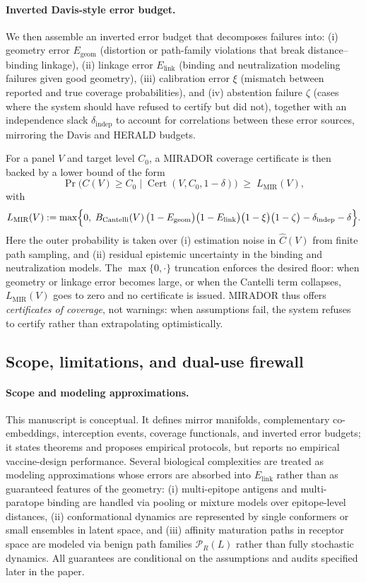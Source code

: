 \documentclass[11pt]{article}
\DeclareMathOperator{\Cert}{Cert}
\newcommand{\Pcal}{\mathcal{P}}
\begin{document}
\paragraph{Inverted Davis-style error budget.}
We then assemble an inverted error budget that decomposes failures into:
(i) geometry error $E_{\text{geom}}$ (distortion or path-family violations that break distance–binding
linkage),
(ii) linkage error $E_{\text{link}}$ (binding and neutralization modeling failures given good geometry),
(iii) calibration error $\xi$ (mismatch between reported and true coverage probabilities), and
(iv) abstention failure $\zeta$ (cases where the system should have refused to certify but did not),
together with an independence slack $\delta_{\text{indep}}$ to account for correlations between these
error sources, mirroring the Davis and HERALD budgets.\ 

For a panel $V$ and target level $C_0$, a MIRADOR coverage certificate is then backed by a
lower bound of the form
\[
\Pr\!\bigl(C(V) \ge C_0 \;\big|\; \Cert(V, C_0, 1-\delta)\bigr)
\;\ge\;
L_{\text{MIR}}(V),
\]
with
\[
L_{\text{MIR}}(V)
:= \max\Bigl\{0,\;
B_{\text{Cantelli}}(V)\,
\bigl(1-E_{\text{geom}}\bigr)\bigl(1-E_{\text{link}}\bigr)\bigl(1-\xi\bigr)\bigl(1-\zeta\bigr)
- \delta_{\text{indep}} - \delta\Bigr\}.
\]
Here the outer probability is taken over
(i) estimation noise in $\widehat{C}(V)$ from finite path sampling, and
(ii) residual epistemic uncertainty in the binding and neutralization models.
The $\max\{0,\cdot\}$ truncation enforces the desired floor: when geometry or linkage error becomes
large, or when the Cantelli term collapses, $L_{\text{MIR}}(V)$ goes to zero and no certificate is
issued. MIRADOR thus offers \emph{certificates of coverage}, not warnings: when assumptions
fail, the system refuses to certify rather than extrapolating optimistically.

\subsection{Scope, limitations, and dual-use firewall}

\paragraph{Scope and modeling approximations.}
This manuscript is conceptual. It defines mirror manifolds, complementary co-embeddings,
interception events, coverage functionals, and inverted error budgets; it states theorems and
proposes empirical protocols, but reports no empirical vaccine-design performance. Several
biological complexities are treated as modeling approximations whose errors are absorbed into
$E_{\text{link}}$ rather than as guaranteed features of the geometry:
(i) multi-epitope antigens and multi-paratope binding are handled via pooling or mixture models
over epitope-level distances,
(ii) conformational dynamics are represented by single conformers or small ensembles in latent
space, and
(iii) affinity maturation paths in receptor space are modeled via benign path families
$\Pcal_R(L)$ rather than fully stochastic dynamics. All guarantees are conditional on the
assumptions and audits specified later in the paper.
\end{document}
